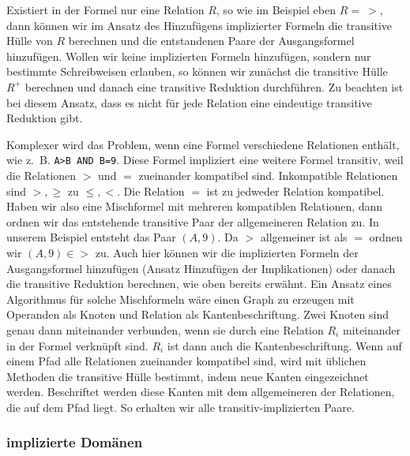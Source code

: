 Existiert in der Formel nur eine Relation $R$, so wie im Beispiel eben $R=\ >$, dann können wir im Ansatz des Hinzufügens implizierter Formeln die transitive Hülle von $R$ berechnen und die entstandenen Paare der Ausgangsformel hinzufügen. Wollen wir keine implizierten Formeln hinzufügen, sondern nur bestimmte Schreibweisen erlauben, so können wir zunächst die transitive Hülle $R^+$ berechnen und danach eine transitive Reduktion durchführen. Zu beachten ist bei diesem Ansatz, dass es nicht für jede Relation eine eindeutige transitive Reduktion gibt. 

Komplexer wird das Problem, wenn eine Formel verschiedene Relationen enthält, wie \mbox{z. B.} \verb|A>B AND B=9|. Diese Formel impliziert eine weitere Formel transitiv, weil die Relationen $>$ und $=$ zueinander kompatibel sind. Inkompatible Relationen sind $>,\geq$ zu $\leq,<$. Die Relation $=$ ist zu jedweder Relation kompatibel. Haben wir also eine Mischformel mit mehreren kompatiblen Relationen, dann ordnen wir das entstehende transitive Paar der allgemeineren Relation zu. In unserem Beispiel entsteht das Paar $(A,9)$. Da $>$ allgemeiner ist als $=$ ordnen wir $(A,9) \in >$ zu. Auch hier können wir die implizierten Formeln der Ausgangsformel hinzufügen (Ansatz Hinzufügen der Implikationen) oder danach die transitive Reduktion berechnen, wie oben bereits erwähnt. Ein Ansatz eines Algorithmus für solche Mischformeln wäre einen Graph zu erzeugen mit Operanden als Knoten und Relation als Kantenbeschriftung. Zwei Knoten sind genau dann miteinander verbunden, wenn sie durch eine Relation $R_i$ miteinander in der Formel verknüpft sind. $R_i$ ist dann auch die Kantenbeschriftung. Wenn auf einem Pfad alle Relationen zueinander kompatibel sind, wird mit üblichen Methoden die transitive Hülle bestimmt, indem neue Kanten eingezeichnet werden. Beschriftet werden diese Kanten mit dem allgemeineren der Relationen, die auf dem Pfad liegt. So erhalten wir alle transitiv-implizierten Paare.

\subsubsection{implizierte Domänen}

